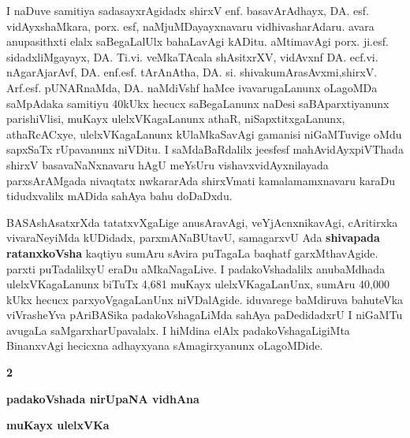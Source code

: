 \medskip

I naDuve samitiya sadasayxrAgidadx shirxV enf. basavArAdhayx, DA. esf. vidAyxshaMkara, porx. esf, naMjuMDayayxnavaru vidhivasha\-rAdaru. avara anupa\-sithxti elalx saBegaLalUlx bahaLavAgi kADitu. aMtimavAgi porx. ji.esf. sidadxliMgayayx, DA. Ti.vi. veMkaTAcala shAsitxrXV, vidAvxnf DA. ecf.vi. nAgarAjarAvf, DA. enf.esf. tArAnAtha, DA. si. shivakumArasAvxmi,\break shirxV. Arf.esf. \hbox{pUNARnaMda}, DA. naMdiVshf haMce ivavaru\-gaLanunx oLagoMDa saMpAdaka samitiyu 40kUkx hecucx saBe\-gaLanunx naDesi saBA\-parxtiyanunx parishiVlisi, muKayx ulelxVKagaLanunx athaR, niSapxtitxgaLanunx, athaRcACxye, ulelxVKagaLanunx kUlaMkaSavAgi gamanisi niGaMTu\-vige oMdu sapxSaTx rUpavanunx niVDitu. I saMdaBaRdalilx je{esf}{esf} mahAvidAyxpiVThada shirxV basavaNaNxnavaru hAgU \hbox{meYsUru} vishavxvidAyxnilayada parxsArAMgada nivaqtatx nwkararAda shirxVmati kamalamamxnavaru karaDu tidudxvalilx mADida sahAya bahu doDaDxdu.

\medskip

BASAshAsatxrXda tatatxvXgaLige anusAravAgi, veYjAcnxnikavAgi, cAritirxka vivaraNeyiMda kUDidadx, parxmANaBUtavU, samagarxvU Ada \textbf{shivapada ratanxkoVsha} kaqtiyu sumAru sAvira puTagaLa baqhatf garxMthavAgide. parxti puTadalilxyU eraDu aMkaNagaLive. I padakoVshadalilx anubaMdhada ulelxVKagaLanunx biTuTx 4,681 muKayx ulelxVKagaLanUnx, sumAru 40,000 kUkx hecucx parxyoVga\-gaLanUnx niVDalAgide. iduvarege baMdiruva bahuteVka viVrasheYva pAriBASika padakoVshagaLiMda sahAya paDedidadxrU I niGaMTu avugaLa saMgarxharUpa\-valalx. I hiMdina elAlx padakoVshagaLigiMta BinanxvAgi hecicxna adhayxyana sAmagirxyanunx oLagoMDide. 

\newpage

\begin{center}
{\large\bfseries 2}
\bigskip

{\Large\bf padakoVshada nirUpaNA vidhAna}

\bigskip

{\large\bf muKayx ulelxVKa}
\end{center}

